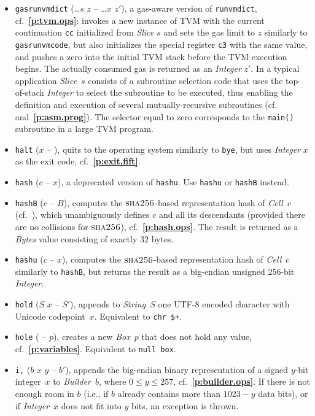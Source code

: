 \documentclass[12pt,oneside]{article}
\def\refpoint#1{{\rm\textbf{\ref{#1}}}}
\let\ptref=\refpoint
\def\opsc#1{\operatorname{\textsc{#1}}}
\def\Sha{\opsc{sha256}}
\begin{document}
\begin{itemize}
\item {\tt gasrunvmdict} (\dots $s$ $z$ -- \dots $x$ $z'$), a gas-aware version of {\tt runvmdict}, cf.~\ptref{p:tvm.ops}: invokes a new instance of TVM with the current continuation {\tt cc} initialized from {\em Slice\/} $s$ and sets the gas limit to $z$ similarly to {\tt gasrunvmcode}, but also initializes the special register {\tt c3} with the same value, and pushes a zero into the initial TVM stack before the TVM execution begins. The actually consumed gas is returned as an {\em Integer\/} $z'$. In a typical application {\em Slice\/}~$s$ consists of a subroutine selection code that uses the top-of-stack {\em Integer\/} to select the subroutine to be executed, thus enabling the definition and execution of several mutually-recursive subroutines (cf.~\cite[4.6]{TVM} and~\ptref{p:asm.prog}). The selector equal to zero corresponds to the {\tt main()} subroutine in a large TVM program.
\item {\tt halt} ($x$ -- ), quits to the operating system similarly to {\tt bye}, but uses {\em Integer\/} $x$ as the exit code, cf.~\ptref{p:exit.fift}.
\item {\tt hash} ($c$ -- $x$), a deprecated version of {\tt hashu}. Use {\tt hashu} or {\tt hashB} instead. 
\item {\tt hashB} ($c$ -- $B$), computes the $\Sha$-based representation hash of {\em Cell\/}~$c$ (cf.~\cite[3.1]{TVM}), which unambiguously defines $c$ and all its descendants (provided there are no collisions for $\Sha$), cf.~\ptref{p:hash.ops}. The result is returned as a {\em Bytes\/} value consisting of exactly 32 bytes.
\item {\tt hashu} ($c$ -- $x$), computes the $\Sha$-based representation hash of {\em Cell\/}~$c$ similarly to {\tt hashB}, but returns the result as a big-endian unsigned 256-bit {\em Integer}.
\item {\tt hold} ($S$ $x$ -- $S'$), appends to {\em String\/}~$S$ one UTF-8 encoded character with Unicode codepoint~$x$. Equivalent to {\tt chr \$+}.
\item {\tt hole} ( -- $p$), creates a new {\em Box\/}~$p$ that does not hold any value, cf.~\ptref{p:variables}. Equivalent to {\tt null box}.
\item {\tt i,} ($b$ $x$ $y$ -- $b'$), appends the big-endian binary representation of a signed $y$-bit integer~$x$ to {\em Builder\/}~$b$, where $0\leq y\leq 257$, cf.~\ptref{p:builder.ops}. If there is not enough room in $b$ (i.e., if $b$ already contains more than $1023-y$ data bits), or if {\em Integer\/}~$x$ does not fit into $y$ bits, an exception is thrown.

\end{itemize}
\end{document}
